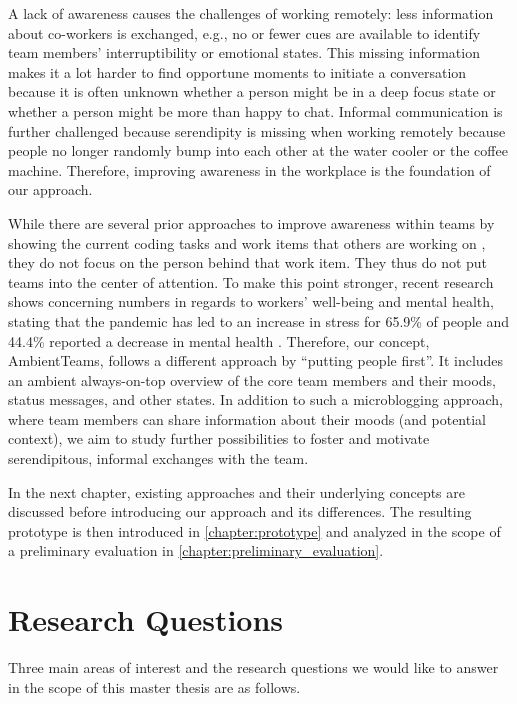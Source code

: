 A lack of awareness causes the challenges of working remotely: less information about co-workers is exchanged, e.g., no or fewer cues are available to identify team members' interruptibility or emotional states. This missing information makes it a lot harder to find opportune moments to initiate a conversation because it is often unknown whether a person might be in a deep focus state or whether a person might be more than happy to chat. Informal communication is further challenged because serendipity is missing when working remotely because people no longer randomly bump into each other at the water cooler or the coffee machine. Therefore, improving awareness in the workplace is the foundation of our approach.

While there are several prior approaches to improve awareness within teams by showing the current coding tasks and work items that others are working on \autocite{biehl2007fastdash, jakobsen2009wipdash}, they do not focus on the person behind that work item. They thus do not put teams into the center of attention. To make this point stronger, recent research shows concerning numbers in regards to workers' well-being and mental health, stating that the pandemic has led to an increase in stress for 65.9\% of people and 44.4\% reported a decrease in mental health \autocite{qualtricksmental}. Therefore, our concept, AmbientTeams, follows a different approach by ``putting people first''. It includes an ambient always-on-top overview of the core team members and their moods, status messages, and other states. In addition to such a microblogging approach, where team members can share information about their moods (and potential context), we aim to study further possibilities to foster and motivate serendipitous, informal exchanges with the team.


In the next chapter, existing approaches and their underlying concepts are discussed before introducing our approach and its differences. The resulting prototype is then introduced in \autoref{chapter:prototype} and analyzed in the scope of a preliminary evaluation in \autoref{chapter:preliminary_evaluation}.


\section{Research Questions}
\label{section:research_questions}
Three main areas of interest and the research questions we would like to answer in the scope of this master thesis are as follows.

